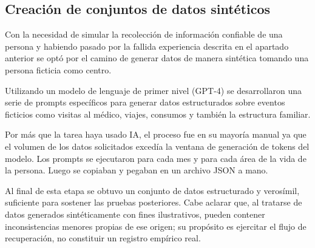 \subsection{Creación de conjuntos de datos sintéticos}

Con la necesidad de simular la recolección de información confiable de una persona y habiendo pasado por la fallida experiencia descrita en el apartado anterior se optó por el camino de generar datos de manera sintética tomando una persona ficticia como centro.

Utilizando un modelo de lenguaje de primer nivel (GPT-4) se desarrollaron una serie de prompts específicos para generar datos estructurados sobre eventos ficticios como visitas al médico, viajes, consumos y también la estructura familiar.

Por más que la tarea haya usado IA, el proceso fue en su mayoría manual ya que el volumen de los datos solicitados excedía la ventana de generación de tokens del modelo. Los prompts se ejecutaron para cada mes y para cada área de la vida de la persona. Luego se copiaban y pegaban en un archivo JSON a mano.

Al final de esta etapa se obtuvo un conjunto de datos estructurado y verosímil, suficiente para sostener las pruebas posteriores. Cabe aclarar que, al tratarse de datos generados sintéticamente con fines ilustrativos, pueden contener inconsistencias menores propias de ese origen; su propósito es ejercitar el flujo de recuperación, no constituir un registro empírico real.